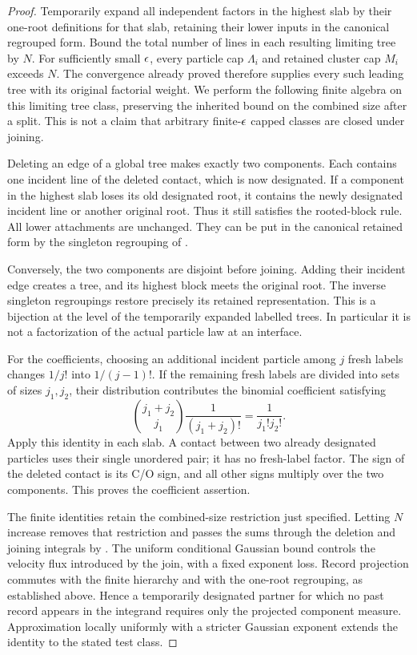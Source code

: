 \begin{proof}
Temporarily expand all independent factors in the highest slab by
their one-root definitions for that slab, retaining their lower inputs
in the canonical regrouped form.  Bound the total number of lines in
each resulting limiting tree by \(N\).
For sufficiently small \(\epsilon\), every particle cap \(\Lambda_i\)
and retained cluster cap \(M_i\) exceeds \(N\).  The convergence
already proved therefore supplies every such leading tree with its
original factorial weight.  We perform the following finite algebra
on this limiting tree class, preserving the inherited bound on the
combined size after a split.  This is not a claim that arbitrary
finite-\(\epsilon\) capped classes are closed under joining.

Deleting an edge of a global tree makes exactly two components.
Each contains one incident
line of the deleted contact, which is now designated.  If a
component in the highest slab loses its old designated root,
it contains the newly designated incident line or another
original root.  Thus it still satisfies the rooted-block rule.
All lower attachments are unchanged.  They can be put in the
canonical retained form by the singleton regrouping of
.

Conversely, the two components are disjoint before joining.
Adding their incident edge creates a tree, and its highest
block meets the original root.  The inverse singleton
regroupings restore precisely its retained representation.
This is a bijection at the level of the temporarily expanded
labelled trees.  In particular it is not a factorization of
the actual particle law at an interface.

For the coefficients, choosing an additional incident particle
among \(j\) fresh labels changes \(1/j!\) into
\(1/(j-1)!\).  If the remaining fresh labels are divided into
sets of sizes \(j_1,j_2\), their distribution contributes the
binomial coefficient satisfying
\[
 \binom{j_1+j_2}{j_1}\frac1{(j_1+j_2)!}
                          =\frac1{j_1!j_2!}.
\]
Apply this identity in each slab.  A contact between two
already designated particles uses their single unordered
pair; it has no fresh-label factor.  The sign of the deleted
contact is its C/O sign, and all other signs multiply over
the two components.  This proves the coefficient assertion.

The finite identities retain the combined-size restriction just
specified.  Letting \(N\) increase removes that restriction and
passes the sums through the deletion and joining integrals by
.  The
uniform conditional Gaussian bound controls the velocity
flux introduced by the join, with a fixed exponent loss.
Record projection commutes with the finite hierarchy and
with the one-root regrouping, as established above.  Hence
a temporarily designated partner for which no past record
appears in the integrand requires only the projected
component measure.  Approximation locally uniformly with
a stricter Gaussian exponent extends the identity to the
stated test class.
\end{proof}

